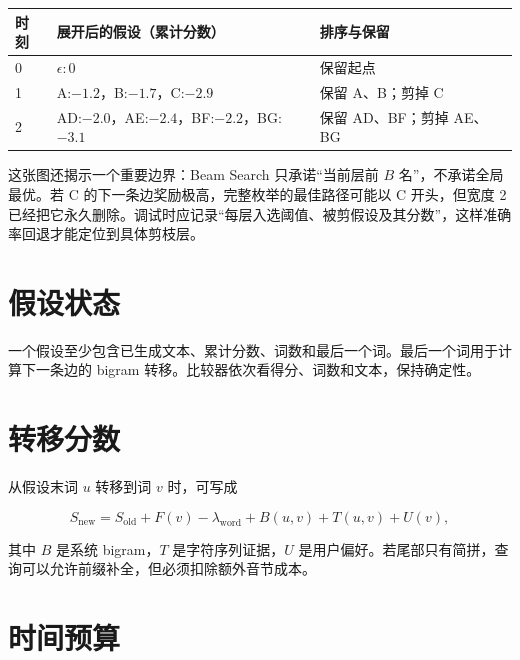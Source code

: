 
\begin{center}
\small
\begin{tabular}{p{1.4cm}p{5.8cm}p{4.9cm}}
\toprule
时刻 & 展开后的假设（累计分数） & 排序与保留 \\
\midrule
0 & \(\epsilon:0\) & 保留起点 \\
1 & A:\(-1.2\)，B:\(-1.7\)，C:\(-2.9\) & 保留 A、B；剪掉 C \\
2 & AD:\(-2.0\)，AE:\(-2.4\)，BF:\(-2.2\)，BG:\(-3.1\) & 保留 AD、BF；剪掉 AE、BG \\
\bottomrule
\end{tabular}
\end{center}

这张图还揭示一个重要边界：Beam Search 只承诺“当前层前 \(B\) 名”，不承诺全局最优。若 C 的下一条边奖励极高，完整枚举的最佳路径可能以 C 开头，但宽度 2 已经把它永久删除。调试时应记录“每层入选阈值、被剪假设及其分数”，这样准确率回退才能定位到具体剪枝层。

\section{假设状态}

一个假设至少包含已生成文本、累计分数、词数和最后一个词。最后一个词用于计算下一条边的 bigram 转移。比较器依次看得分、词数和文本，保持确定性。



\section{转移分数}

从假设末词 \(u\) 转移到词 \(v\) 时，可写成

\[
S_{\mathrm{new}}=S_{\mathrm{old}}+F(v)-\lambda_{\mathrm{word}}+B(u,v)+T(u,v)+U(v),
\]

其中 \(B\) 是系统 bigram，\(T\) 是字符序列证据，\(U\) 是用户偏好。若尾部只有简拼，查询可以允许前缀补全，但必须扣除额外音节成本。



\section{时间预算}

